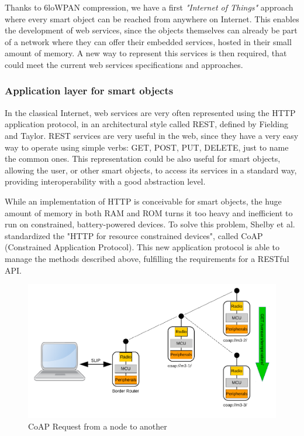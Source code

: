 Thanks to 6loWPAN compression, we have a first \textit{"Internet of Things"} approach where every smart object can be reached from anywhere on Internet.
This enables the development of web services, since the objects themselves can already be part of a network where they can offer their embedded services, hosted in their small amount of memory.
A new way to represent this services is then required, that could meet the current web services specifications and approaches.

\subsubsection{Application layer for smart objects}
In the classical Internet, web services are very often represented using the HTTP application protocol\cite{rfc2616}, in an architectural style called REST, defined by Fielding and Taylor\cite{Fielding02REST}.
REST services are very useful in the web, since they have a very easy way to operate using simple verbs: GET, POST, PUT, DELETE, just to name the common ones.
This representation could be also useful for smart objects, allowing the user, or other smart objects, to access its services in a standard way, providing interoperability with a good abstraction level.

While an implementation of HTTP is conceivable for smart objects, the huge amount of memory in both RAM and ROM turns it too heavy and inefficient to run on constrained, battery-powered devices\cite{Shelby10EWS}.
To solve this problem, Shelby et al. standardized the "HTTP for resource constrained devices"\cite{rfc7252}, called CoAP (Constrained Application Protocol).
This new application protocol is able to manage the methods described above, fulfilling the requirements for a RESTful API.

\begin{figure}[htb]
	\centering
	\includegraphics[width=1\columnwidth]{chapters/background.images/CoAPRequest.pdf}
	\caption{CoAP Request from a node to another}
	\label{fig:CoAPRequest}
\end{figure}

